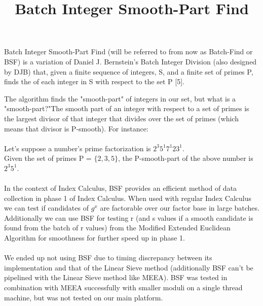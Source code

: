 \documentclass{article}
\title{Batch Integer Smooth-Part Find}
\begin{document}
  \maketitle

  Batch Integer Smooth-Part Find (will be referred to from now as Batch-Find or BSF) is a variation of Daniel J. Bernstein's Batch Integer Division (also designed by DJB) that, given a finite sequence of integers, S, and a finite set of primes P, finds the of each integer in S with respect to the set P [5].

  The algorithm finds the "smooth-part" of integers in our set, but what is a "smooth-part?"The smooth part of an integer with respect to a set of primes is the largest divisor of that integer that divides over the set of primes (which means that divisor is P-smooth).  For instance: \\
  \\
  Let's suppose a number's prime factorization is $2^{3}5^{1}7^{1}23^{1}$. \\
  Given the set of primes P = $\{2, 3, 5\}$, the P-smooth-part of the above number is $2^{3}5^{1}$. \\
  \\
  In the context of Index Calculus, BSF provides an efficient method of data collection in phase 1 of Index Calculus.  When used with regular Index Calculus we can test if candidates of $g^x$ are factorable over our factor base in large batches.  Additionally we can use BSF for testing r (and s values if a smooth candidate is found from the batch of r values) from the Modified Extended Euclidean Algorithm for smoothness for further speed up in phase 1. \\
  \\
  We ended up not using BSF due to timing discrepancy between its implementation and that of the Linear Sieve method (additionally BSF can't be pipelined with the Linear Sieve method like MEEA).  BSF was tested in combination with MEEA successfully with smaller moduli on a single thread machine, but was not tested on our main platform.
\end{document}
